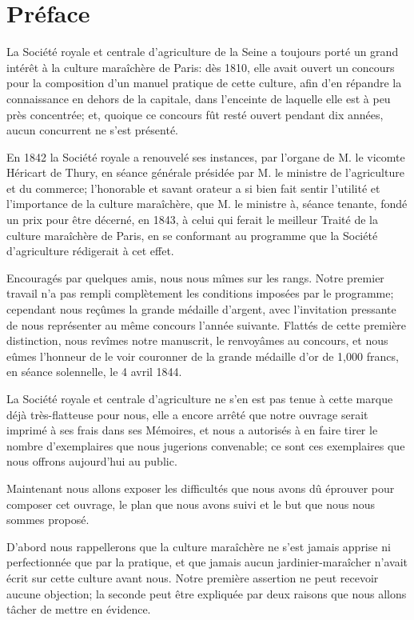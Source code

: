 \documentclass[10pt,a4paper]{book}
\begin{document}
\rhead[\thepage]{\rightmark}
\lhead[\leftmark]{\thepage}

\section*{Préface}

La Société royale et centrale d'agriculture de la Seine a toujours porté un grand intérêt à la culture maraîchère de Paris: dès 1810, elle avait ouvert un concours pour la composition d'un manuel pratique de cette culture, afin d'en répandre la connaissance en dehors de la capitale, dans l'enceinte de laquelle elle est à peu près concentrée; et, quoique ce concours fût resté ouvert pendant dix années, aucun concurrent ne s'est présenté.

En 1842 la Société royale a renouvelé ses instances, par l'organe de M. le vicomte Héricart de Thury, en séance générale présidée par M. le ministre de l'agriculture et du commerce; l'honorable et savant orateur a si bien fait sentir l'utilité et l'importance de la culture maraîchère, que M. le ministre à, séance tenante, fondé un prix pour être décerné, en 1843, à celui qui ferait le meilleur Traité de la culture maraîchère de Paris, en se conformant au programme que la Société d'agriculture rédigerait à cet effet.

Encouragés par quelques amis, nous nous mîmes sur les rangs. Notre premier travail n'a pas rempli complètement les conditions imposées par le programme; cependant nous reçûmes la grande médaille d'argent, avec l'invitation pressante de nous représenter au même concours l'année suivante. Flattés de cette première distinction, nous revîmes notre manuscrit, le renvoyâmes au concours, et nous eûmes l'honneur de le voir couronner de la grande médaille d'or de 1,000 francs, en séance solennelle, le 4 avril 1844.

La Société royale et centrale d'agriculture ne s'en est pas tenue à cette marque déjà très-flatteuse pour nous, elle a encore arrêté que notre ouvrage serait imprimé à ses frais dans ses Mémoires, et nous a autorisés à en faire tirer le nombre d'exemplaires que nous jugerions convenable; ce sont ces exemplaires que nous offrons aujourd'hui au public.

Maintenant nous allons exposer les difficultés que nous avons dû éprouver pour composer cet ouvrage, le plan que nous avons suivi et le but que nous nous sommes proposé.

D'abord nous rappellerons que la culture maraîchère ne s'est jamais apprise ni perfectionnée que par la pratique, et que jamais aucun jardinier-maraîcher n'avait écrit sur cette culture avant nous. Notre première assertion ne peut recevoir aucune objection; la seconde peut être expliquée par deux raisons que nous allons tâcher de mettre en évidence.
\end{document}
